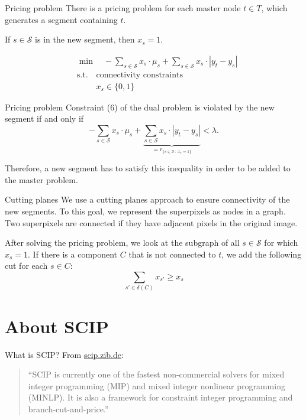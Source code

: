 \documentclass[fleqn]{beamer}
\newcommand{\superpixels}{\mathcal{S}}
\begin{document}
	\begin{frame}{Pricing problem}
		There is a pricing problem for each master node $t\in T$,
		which generates a segment containing $t$.
		
		If $s\in\superpixels$ is in the new segment, then $x_s=1$.		
		 
		\begin{align}
    		&\min\quad -\sum_{s\in\superpixels} x_s\cdot\mu_s + \sum_{s\in\superpixels} x_s\cdot|y_t-y_s| \\
    		&\text{s.t.}\quad \text{connectivity constraints} \\
	    	&\phantom{\text{s.t.}\quad} x_s \in\{0,1\}
		\end{align}
	\end{frame}
	
	\begin{frame}{Pricing problem}
		Constraint (6) of the dual problem is violated by the new segment if and only if
		\[-\sum_{s\in\superpixels} x_s\cdot\mu_s + \underbrace{\sum_{s\in\superpixels} x_s\cdot|y_t-y_s|}_{=r_{\{s\in\superpixels\ :\ x_s=1\}}} < \lambda.\]
        
		Therefore, a new segment has to satisfy this inequality in order to be added to the master problem.
	\end{frame}
    
	\begin{frame}{Cutting planes}
		We use a cutting planes approach to ensure connectivity of the new segments.
        To this goal, we represent the superpixels as nodes in a graph.
        Two superpixels are connected if they have adjacent pixels in the original image.
		
		After solving the pricing problem,
		we look at the subgraph of all $s\in\superpixels$ for which $x_s=1$.
		If there is a component $C$ that is not connected to $t$,
		we add the following cut for each $s\in C$:
		\[\sum_{s'\in\delta(C)}x_{s'} \geq x_s\]
		
	\end{frame}
	
	\section{About SCIP}
	\begin{frame}{What is SCIP?}
		From \url{scip.zib.de}:
		\begin{quote}
			``SCIP is currently one of the fastest non-commercial solvers for mixed integer programming (MIP)
			and mixed integer nonlinear programming (MINLP).
			It is also a framework for constraint integer programming and branch-cut-and-price.''
		\end{quote}
	\end{frame}
\end{document}
